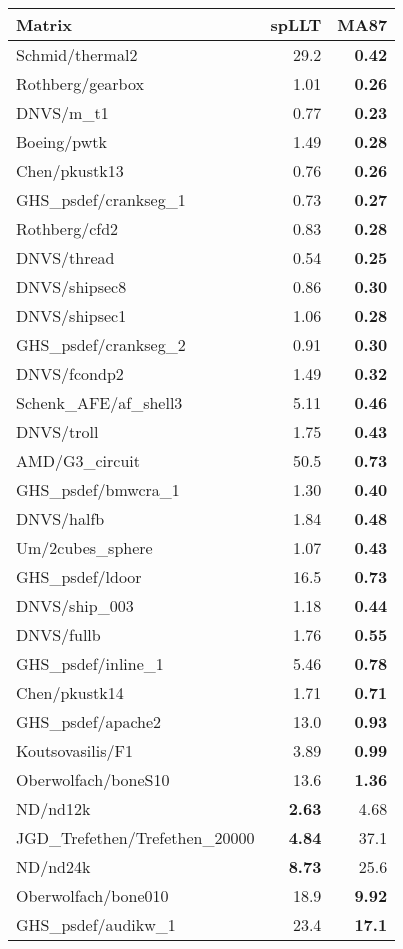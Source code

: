 \begin{tabular}{l|rr}
  \hline
  Matrix & spLLT      & MA87 \\
  \hline
  Schmid/thermal2                     & 29.2 & \bf0.42 \\
  Rothberg/gearbox                    & 1.01 & \bf0.26 \\
  DNVS/m\_t1                          & 0.77 & \bf0.23 \\
  Boeing/pwtk                         & 1.49 & \bf0.28 \\
  Chen/pkustk13                       & 0.76 & \bf0.26 \\
  GHS\_psdef/crankseg\_1              & 0.73 & \bf0.27 \\
  Rothberg/cfd2                       & 0.83 & \bf0.28 \\
  DNVS/thread                         & 0.54 & \bf0.25 \\
  DNVS/shipsec8                       & 0.86 & \bf0.30 \\
  DNVS/shipsec1                       & 1.06 & \bf0.28 \\
  GHS\_psdef/crankseg\_2              & 0.91 & \bf0.30 \\
  DNVS/fcondp2                        & 1.49 & \bf0.32 \\
  Schenk\_AFE/af\_shell3              & 5.11 & \bf0.46 \\
  DNVS/troll                          & 1.75 & \bf0.43 \\
  AMD/G3\_circuit                     & 50.5 & \bf0.73 \\
  GHS\_psdef/bmwcra\_1                & 1.30 & \bf0.40 \\
  DNVS/halfb                          & 1.84 & \bf0.48 \\
  Um/2cubes\_sphere                   & 1.07 & \bf0.43 \\
  GHS\_psdef/ldoor                    & 16.5 & \bf0.73 \\
  DNVS/ship\_003                      & 1.18 & \bf0.44 \\
  DNVS/fullb                          & 1.76 & \bf0.55 \\
  GHS\_psdef/inline\_1                & 5.46 & \bf0.78 \\
  Chen/pkustk14                       & 1.71 & \bf0.71 \\
  GHS\_psdef/apache2                  & 13.0 & \bf0.93 \\
  Koutsovasilis/F1                    & 3.89 & \bf0.99 \\
  Oberwolfach/boneS10                 & 13.6 & \bf1.36 \\
  ND/nd12k                            & \bf2.63 & 4.68 \\
  JGD\_Trefethen/Trefethen\_20000     & \bf4.84 & 37.1 \\
  ND/nd24k                            & \bf8.73 & 25.6 \\
  Oberwolfach/bone010                 & 18.9 & \bf9.92 \\
  GHS\_psdef/audikw\_1                & 23.4 & \bf17.1 \\
  \hline
\end{tabular}
